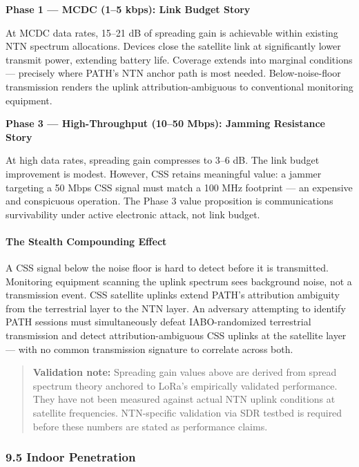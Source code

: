 \documentclass[
  11pt,
]{article}
\begin{document}
\textbf{Phase 1 --- MCDC (1--5 kbps): Link Budget Story}

At MCDC data rates, 15--21 dB of spreading gain is achievable within
existing NTN spectrum allocations. Devices close the satellite link at
significantly lower transmit power, extending battery life. Coverage
extends into marginal conditions --- precisely where PATH's NTN anchor
path is most needed. Below-noise-floor transmission renders the uplink
attribution-ambiguous to conventional monitoring equipment.

\textbf{Phase 3 --- High-Throughput (10--50 Mbps): Jamming Resistance
Story}

At high data rates, spreading gain compresses to 3--6 dB. The link
budget improvement is modest. However, CSS retains meaningful value: a
jammer targeting a 50 Mbps CSS signal must match a 100 MHz footprint ---
an expensive and conspicuous operation. The Phase 3 value proposition is
communications survivability under active electronic attack, not link
budget.

\hypertarget{the-stealth-compounding-effect}{%
\paragraph{The Stealth Compounding
Effect}\label{the-stealth-compounding-effect}}

A CSS signal below the noise floor is hard to detect before it is
transmitted. Monitoring equipment scanning the uplink spectrum sees
background noise, not a transmission event. CSS satellite uplinks extend
PATH's attribution ambiguity from the terrestrial layer to the NTN
layer. An adversary attempting to identify PATH sessions must
simultaneously defeat IABO-randomized terrestrial transmission and
detect attribution-ambiguous CSS uplinks at the satellite layer --- with
no common transmission signature to correlate across both.

\begin{quote}
\textbf{Validation note:} Spreading gain values above are derived from
spread spectrum theory anchored to LoRa's empirically validated
performance. They have not been measured against actual NTN uplink
conditions at satellite frequencies. NTN-specific validation via SDR
testbed is required before these numbers are stated as performance
claims.
\end{quote}

\hypertarget{indoor-penetration}{%
\subsubsection{9.5 Indoor Penetration}\label{indoor-penetration}}
\end{document}
